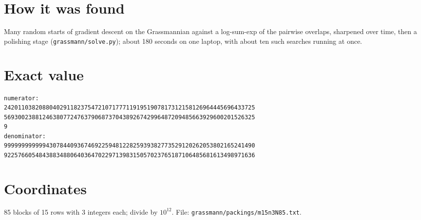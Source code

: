 \documentclass[11pt,a4paper]{article}
\begin{document}
\section{How it was found}
Many random starts of gradient descent on the Grassmannian against a log-sum-exp of the pairwise overlaps, sharpened over time, then a polishing stage (\texttt{grassmann/solve.py}); about 180 seconds on one laptop, with about ten such searches running at once.


\appendix
\section{Exact value}
{\small
\begin{verbatim}
numerator:
242011038208804029118237547210717771191951907817312158126964445696433725
569300238812463807724763790687370438926742996487209485663929600201526325
9
denominator:
999999999999430784409367469225948122825939382773529120262053802165241490
922576605484388348806403647022971398315057023765187106485681613498971636
\end{verbatim}}

\section{Coordinates}
85 blocks of 15 rows with 3 integers each; divide by $10^{12}$. File: \texttt{grassmann/packings/m15n3N85.txt}.
{\tiny
\begin{multicols}{3}
\end{multicols}}
\end{document}
